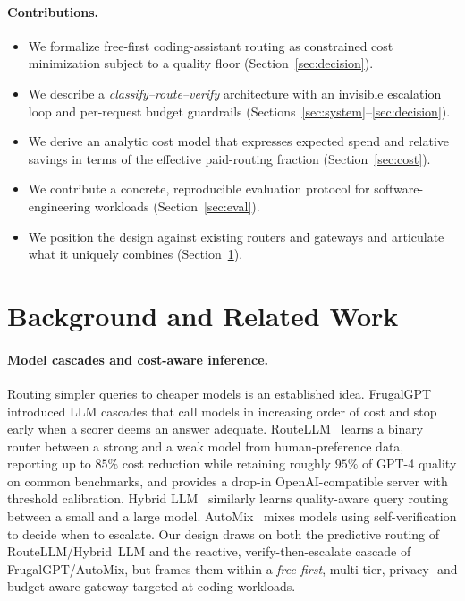 \documentclass[11pt]{article}
\begin{document}
\paragraph{Contributions.}
\begin{itemize}
  \item We formalize free-first coding-assistant routing as constrained cost
        minimization subject to a quality floor (Section~\ref{sec:decision}).
  \item We describe a \emph{classify--route--verify} architecture with an
        invisible escalation loop and per-request budget guardrails
        (Sections~\ref{sec:system}--\ref{sec:decision}).
  \item We derive an analytic cost model that expresses expected spend and
        relative savings in terms of the effective paid-routing fraction
        (Section~\ref{sec:cost}).
  \item We contribute a concrete, reproducible evaluation protocol for
        software-engineering workloads (Section~\ref{sec:eval}).
  \item We position the design against existing routers and gateways and
        articulate what it uniquely combines (Section~\ref{sec:related}).
\end{itemize}

\section{Background and Related Work}
\label{sec:related}
\paragraph{Model cascades and cost-aware inference.}
Routing simpler queries to cheaper models is an established idea.
FrugalGPT~\cite{frugalgpt} introduced LLM cascades that call models in
increasing order of cost and stop early when a scorer deems an answer adequate.
RouteLLM~\cite{routellm} learns a binary router between a strong and a weak
model from human-preference data, reporting up to $85\%$ cost reduction while
retaining roughly $95\%$ of GPT-4 quality on common benchmarks, and provides a
drop-in OpenAI-compatible server with threshold calibration.
Hybrid LLM~\cite{hybridllm} similarly learns quality-aware query routing
between a small and a large model. AutoMix~\cite{automix} mixes models using
self-verification to decide when to escalate. Our design draws on both the
predictive routing of RouteLLM/Hybrid~LLM and the reactive, verify-then-escalate
cascade of FrugalGPT/AutoMix, but frames them within a \emph{free-first},
multi-tier, privacy- and budget-aware gateway targeted at coding workloads.
\end{document}
